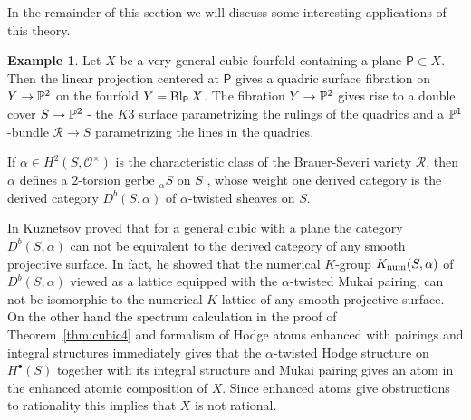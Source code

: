 \documentclass[twoside,leqno]{article}
\numberwithin{equation}{section}
\theoremstyle{plain}
\theoremstyle{definition}
\newtheorem{example}[equation]{Example}
\begin{document}
\medskip

In the remainder of this section we will discuss some interesting applications of this theory.

\begin{example} \label{ex:cubic+plane}  Let $X$ be a  very general cubic
fourfold containing a plane $\mathsf{P} \subset X$. Then
the linear projection centered at $\mathsf{P}$ gives a quadric
  surface fibration on $Y \to \mathbb P^2$ on the fourfold $Y =
  \operatorname{Bl}_{\mathsf{P}}X$. The fibration $Y \to \mathbb P^2$ gives rise to
a double cover $S \to \mathbb P^2$ - the $K3$ surface
parametrizing the rulings of the quadrics and a $\mathbb P^1$-bundle $\mathcal{R} \to S$ parametrizing the  lines in the quadrics.

If $\alpha \in H^2(S,\mathcal{O}^{\times})$ is the characteristic
class of the Brauer-Severi variety $\mathcal{R}$, then $\alpha$ defines a $2$-torsion gerbe ${}_{\alpha}S$ on $S$ , whose weight one derived category is the derived category $D^{b}(S,\alpha)$ of $\alpha$-twisted sheaves on $S$. 

In \cite{Kuznetsov-cubic4fold} Kuznetsov proved that for a general cubic with a plane the category $D^{b}(S,\alpha)$ can not be equivalent to the derived category of any smooth projective surface. In fact, he showed 
that the numerical $K$-group $K_{\operatorname{num}}(S,\alpha)$ of  $D^{b}(S,\alpha)$ viewed as a lattice equipped with the $\alpha$-twisted Mukai pairing, can not be isomorphic to the numerical $K$-lattice of any smooth projective surface. On the other hand the spectrum calculation in the proof of Theorem~\ref{thm:cubic4} and formalism of Hodge atoms enhanced with pairings and integral structures immediately gives  that the $\alpha$-twisted Hodge structure on $H^{\bullet}(S)$ together with its integral structure and Mukai pairing gives an atom in the enhanced atomic composition of $X$. Since enhanced atoms give obstructions to rationality this implies that $X$ is not rational.
\end{example}
\end{document}
